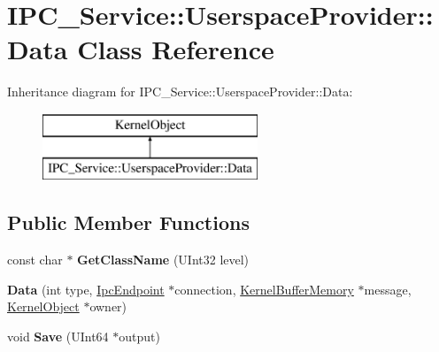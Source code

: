 \hypertarget{class_i_p_c___service_1_1_userspace_provider_1_1_data}{}\section{I\+P\+C\+\_\+\+Service\+:\+:Userspace\+Provider\+:\+:Data Class Reference}
\label{class_i_p_c___service_1_1_userspace_provider_1_1_data}
Inheritance diagram for I\+P\+C\+\_\+\+Service\+:\+:Userspace\+Provider\+:\+:Data\+:\begin{figure}[H]
\begin{center}
\leavevmode
\includegraphics[height=2.000000cm]{class_i_p_c___service_1_1_userspace_provider_1_1_data}
\end{center}
\end{figure}
\subsection*{Public Member Functions}
\begin{DoxyCompactItemize}
\item 
\mbox{\label{class_i_p_c___service_1_1_userspace_provider_1_1_data_a6fe54b26918c542ebceb4a2d32964975}} 
const char $\ast$ {\bfseries Get\+Class\+Name} (U\+Int32 level)
\item 
\mbox{\label{class_i_p_c___service_1_1_userspace_provider_1_1_data_ae630842724e94b4fd389d2d60c00a4bf}} 
{\bfseries Data} (int type, \hyperlink{class_ipc_endpoint}{Ipc\+Endpoint} $\ast$connection, \hyperlink{class_kernel_buffer_memory}{Kernel\+Buffer\+Memory} $\ast$message, \hyperlink{class_kernel_object}{Kernel\+Object} $\ast$owner)
\item 
\mbox{\label{class_i_p_c___service_1_1_userspace_provider_1_1_data_ad2ea3d7a2e440cc2592a51b287646fc2}} 
void {\bfseries Save} (U\+Int64 $\ast$output)
\end{DoxyCompactItemize}
